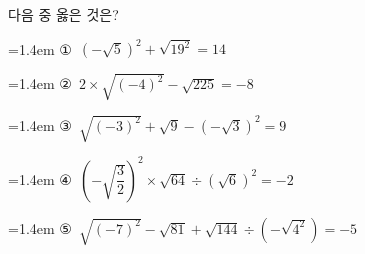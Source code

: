다음 중 옳은 것은?
\par\medskip\par\noindent\hangindent=1.4em {\small ①}\ $(-\sqrt{5})^2+\sqrt{19^2}=14$\par\noindent\hangindent=1.4em {\small ②}\ $2\times\sqrt{(-4)^2}-\sqrt{225}=-8$\par\noindent\hangindent=1.4em {\small ③}\ $\sqrt{(-3)^2}+\sqrt{9}-(-\sqrt{3})^2=9$\par\noindent\hangindent=1.4em {\small ④}\ $\left(-\sqrt{\dfrac{3}{2}}\right)^2\times\sqrt{64}\div(\sqrt{6})^2=-2$\par\noindent\hangindent=1.4em {\small ⑤}\ $\sqrt{(-7)^2}-\sqrt{81}+\sqrt{144}\div(-\sqrt{4^2})=-5$\par\medskip
